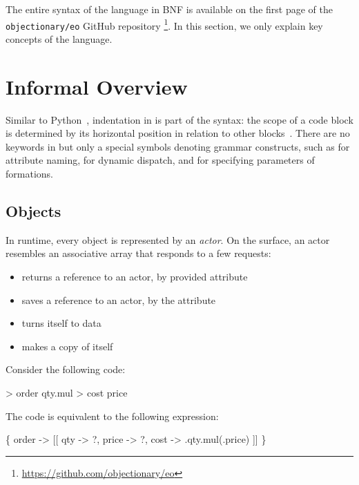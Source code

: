 
The entire syntax of the \eolang{} language in BNF is available on the first page of the \texttt{objectionary/eo} GitHub repository%
  \footnote{\url{https://github.com/objectionary/eo}}.
In this section, we only explain key concepts of the language.

\section{Informal Overview}

Similar to Python~\citep{lutz2013learning}, indentation in \eolang{} is part of the syntax: the scope of a code block is determined by its horizontal position in relation to other blocks~\citep{landin1966next}.
There are no keywords in \eolang{} but only a special symbols denoting grammar constructs, such as \ff{>} for attribute naming,  for dynamic dispatch, and \ff{[]} for specifying parameters of formations.



\subsection{Objects}

In \eolang{} runtime, every object is represented by an \emph{actor}.
On the surface, an actor resembles an associative array that responds to a few requests:
\begin{itemize}
  \item {} returns a reference to an actor, by provided attribute
  \item {} saves a reference to an actor, by the attribute
  \item {} turns itself to data
  \item {} makes a copy of itself
\end{itemize}

Consider the following code:

\begin{ffcode}
 > order
  qty.mul > cost
    price
\end{ffcode}

The code is equivalent to the following \phic{} expression:
\begin{phiquation}
\Big\{ order -> [[ qty -> ?, price -> ?, cost -> \xi.qty.mul(\xi.price) ]] \Big\}
\end{phiquation}

